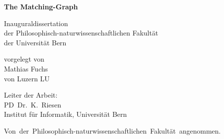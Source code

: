 

\thispagestyle{empty}
  \large

  \vfill

  \begin{center}
    \Large
{\bf The Matching-Graph} \\
\vspace*{2cm}
    \large

    Inauguraldissertation                              \\
    der Philosophisch-naturwissenschaftlichen Fakult\"at \\
    der Universit\"at Bern
  \end{center}

  \vfill

  \begin{center}
    vorgelegt von                \\ \vspace*{0.75cm} 
       {Mathias Fuchs} \\ \vspace*{0.75cm} 
  von Luzern LU
  \end{center}

  \vfill\vfill\vfill\vfill

  \begin{center}
Leiter der Arbeit:\\[7pt]
PD~Dr.~K.~Riesen\\
Institut f\"ur Informatik, Universit\"at Bern

  \end{center}

  \vfill\vfill

  \noindent
  \mbox{Von der Philosophisch-naturwissenschaftlichen Fakult\"at angenommen.}

\vspace{2cm}

\normalsize



